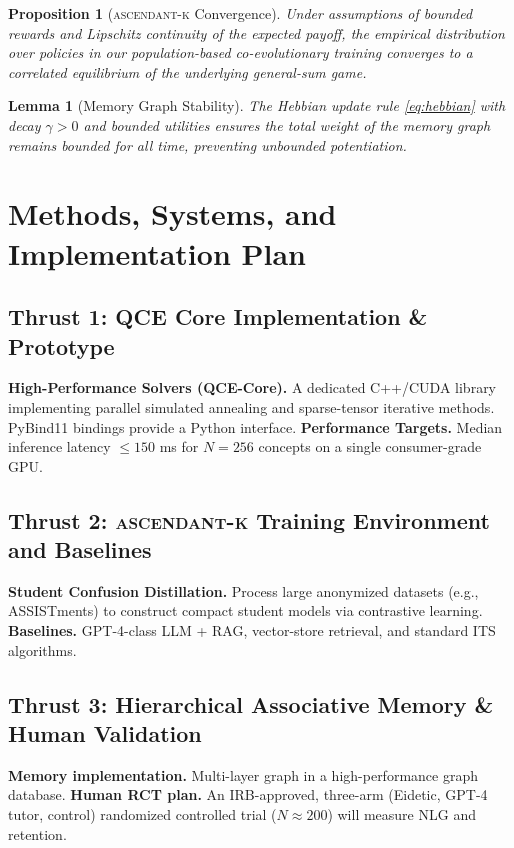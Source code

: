 \documentclass[12pt,oneside]{report}
\newcommand{\framework}[1]{\textsc{#1}}
\newcommand{\ascendantk}{\framework{ascendant-k}}
\theoremstyle{definition}
\theoremstyle{plain}
\newtheorem{proposition}{Proposition}[chapter]
\newtheorem{lemma}{Lemma}[chapter]
\theoremstyle{remark}
\begin{document}
\begin{proposition}[\ascendantk{} Convergence]\label{prop:ascendant-conv}
Under assumptions of bounded rewards and Lipschitz continuity of the expected payoff, the empirical distribution over policies in our population-based co-evolutionary training converges to a correlated equilibrium of the underlying general-sum game.
\end{proposition}

\begin{lemma}[Memory Graph Stability]\label{lem:memory-stable}
The Hebbian update rule \eqref{eq:hebbian} with decay $\gamma>0$ and bounded utilities ensures the total weight of the memory graph remains bounded for all time, preventing unbounded potentiation.
\end{lemma}

\chapter{Methods, Systems, and Implementation Plan}
\section{Thrust 1: QCE Core Implementation \& Prototype}
\textbf{High-Performance Solvers (QCE-Core).} A dedicated C++/CUDA library implementing parallel simulated annealing and sparse-tensor iterative methods. PyBind11 bindings provide a Python interface.
\textbf{Performance Targets.} Median inference latency $\le 150$ ms for $N=256$ concepts on a single consumer-grade GPU.

\section{Thrust 2: \ascendantk{} Training Environment and Baselines}
\textbf{Student Confusion Distillation.} Process large anonymized datasets (e.g., ASSISTments) to construct compact student models via contrastive learning.
\textbf{Baselines.} GPT-4-class LLM + RAG, vector-store retrieval, and standard ITS algorithms.

\section{Thrust 3: Hierarchical Associative Memory \& Human Validation}
\textbf{Memory implementation.} Multi-layer graph in a high-performance graph database.
\textbf{Human RCT plan.} An IRB-approved, three-arm (Eidetic, GPT-4 tutor, control) randomized controlled trial ($N \approx 200$) will measure NLG and retention.
\end{document}
